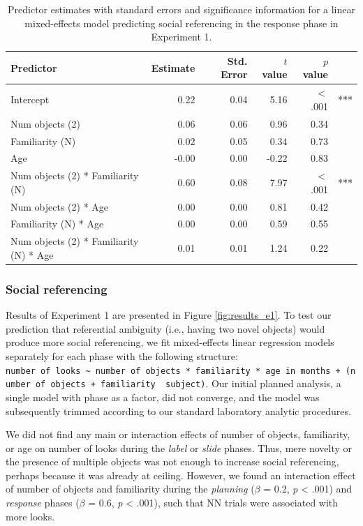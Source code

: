 \documentclass[a4paper,man,apacite,floatsintext]{apa6}
\begin{document}
\begin{table}[b]
\centering
\begin{tabular}{lrrrrl}
 Predictor & Estimate & Std. Error & $t$ value & $p$ value &  \\ 
  \hline
Intercept & 0.22 & 0.04 & 5.16 & $<$ .001 & *** \\ 
  Num objects (2) & 0.06 & 0.06 & 0.96 & 0.34 &  \\ 
  Familiarity (N) & 0.02 & 0.05 & 0.34 & 0.73 &  \\ 
  Age & -0.00 & 0.00 & -0.22 & 0.83 &  \\ 
  Num objects (2) * Familiarity (N) & 0.60 & 0.08 & 7.97 & $<$ .001 & *** \\ 
  Num objects (2) * Age & 0.00 & 0.00 & 0.81 & 0.42 &  \\ 
  Familiarity (N) * Age & 0.00 & 0.00 & 0.59 & 0.55 &  \\ 
  Num objects (2) * Familiarity (N) * Age & 0.01 & 0.01 & 1.24 & 0.22 &  \\ 
   \hline
\end{tabular}
\caption{Predictor estimates with standard errors and significance information for a linear mixed-effects model predicting social referencing in the response phase in Experiment 1.} 
\label{tab:exp1_r_reg}
\end{table}

\subsubsection{Social referencing}\label{social-referencing}

Results of Experiment 1 are presented in Figure \ref{fig:results_e1}. To
test our prediction that referential ambiguity (i.e., having two novel
objects) would produce more social referencing, we fit mixed-effects
linear regression models separately for each phase with the following
structure:
\texttt{number\ of\ looks\ \textasciitilde{}\ number\ of\ objects\ *\ familiarity\ *\ age\ in\ months\ +\ (number\ of\ objects\ +\ familiarity\ \textbar{}\ subject)}.
Our initial planned analysis, a single model with phase as a factor, did
not converge, and the model was subsequently trimmed according to our
standard laboratory analytic procedures.

We did not find any main or interaction effects of number of objects,
familiarity, or age on number of looks during the \emph{label} or
\emph{slide} phases. Thus, mere novelty or the presence of multiple
objects was not enough to increase social referencing, perhaps because
it was already at ceiling. However, we found an interaction effect of
number of objects and familiarity during the \emph{planning} (\(\beta\)
= 0.2, \emph{p} \textless{} .001) and \emph{response} phases (\(\beta\)
= 0.6, \emph{p} \textless{} .001), such that NN trials were associated
with more looks.
\end{document}
